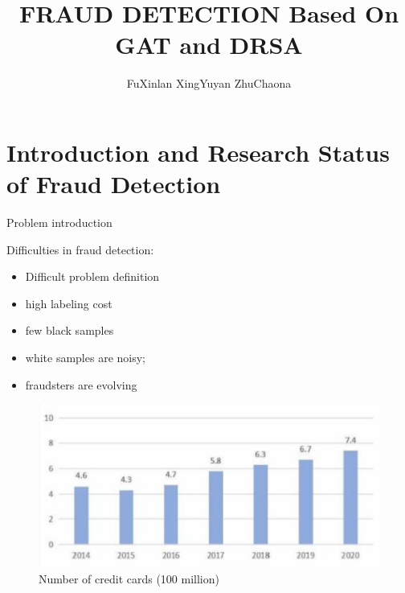 \documentclass[compress,xcolor=table,hyperref]{beamer}
\title{\vspace{1em}FRAUD DETECTION \newline Based On GAT and DRSA}
\subtitle{} %
\date{\vspace{3em}\formatdate{23}{04}{2020}}
\author{FuXinlan XingYuyan ZhuChaona}
\begin{document}
\begin{frame}[plain]
	\titlepage
	\setcounter{framenumber}{0}
\end{frame}


\section{Introduction and Research Status
	of Fraud Detection} 

\begin{frame}{Problem introduction}
	
	\begin{block}{Difficulties in fraud detection:}
		\vspace{-1em}
		\begin{multicols}{2}
			\begin{itemize}
			\item
			Difficult problem definition                 
			\item high labeling cost
			\item	few black samples              
			\item          white samples are noisy;
			\item	fraudsters are evolving
		\end{itemize}
		\end{multicols}
	\end{block}
\begin{center}
		\begin{minipage}{0.45\linewidth}
		\begin{figure}[h]
			\centering
			\includegraphics[width=1.1\linewidth]{images/fig1}
			\caption{Number of credit cards (100 million)}
			\label{fig:fig1}
		\end{figure}
	\end{minipage}
	\hspace{0.07\linewidth}
	\begin{minipage}{0.45\linewidth}

\end{minipage}
\end{center}
\end{frame}
\end{document}
